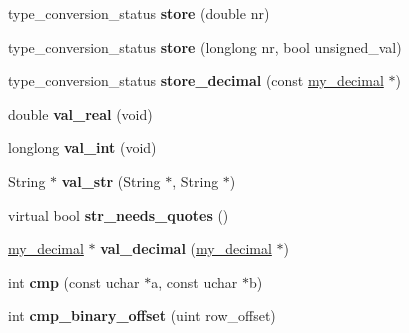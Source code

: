\begin{DoxyCompactItemize}
\mbox{\label{classField__bit_a0aca0c92c57981b43d1060204c04a9f1}} 
type\+\_\+conversion\+\_\+status {\bfseries store} (double nr)
\item 
\mbox{\label{classField__bit_ab6f2b0297a27c1bc6a279447ca44d37c}} 
type\+\_\+conversion\+\_\+status {\bfseries store} (longlong nr, bool unsigned\+\_\+val)
\item 
\mbox{\label{classField__bit_aea817c5b2ed392e3b2a6ec7cc87d505d}} 
type\+\_\+conversion\+\_\+status {\bfseries store\+\_\+decimal} (const \mbox{\hyperlink{classmy__decimal}{my\+\_\+decimal}} $\ast$)
\item 
\mbox{\label{classField__bit_a352e5923066639fd475873b95802a02c}} 
double {\bfseries val\+\_\+real} (void)
\item 
\mbox{\label{classField__bit_aaaa8b52b2e1697d7668975e8ec7a5814}} 
longlong {\bfseries val\+\_\+int} (void)
\item 
\mbox{\label{classField__bit_a308ab1b8372da77f4a89edc149b2e21a}} 
String $\ast$ {\bfseries val\+\_\+str} (String $\ast$, String $\ast$)
\item 
\mbox{\label{classField__bit_a643751b1b23d97d04f47f27e6f674acc}} 
virtual bool {\bfseries str\+\_\+needs\+\_\+quotes} ()
\item 
\mbox{\label{classField__bit_a5e64ff6f7e9f4e1c82b1a9cbcb434f88}} 
\mbox{\hyperlink{classmy__decimal}{my\+\_\+decimal}} $\ast$ {\bfseries val\+\_\+decimal} (\mbox{\hyperlink{classmy__decimal}{my\+\_\+decimal}} $\ast$)
\item 
\mbox{\label{classField__bit_a98cc9c798435da85aab0ff6a5a8d374a}} 
int {\bfseries cmp} (const uchar $\ast$a, const uchar $\ast$b)
\item 
\mbox{\label{classField__bit_a49394a8669920a8849a00688a544be15}} 
int {\bfseries cmp\+\_\+binary\+\_\+offset} (uint row\+\_\+offset)
\item 
\mbox{\label{classField__bit_aa8abe009bea110ed1163261436bdd1e3}} 

\end{DoxyCompactItemize}
